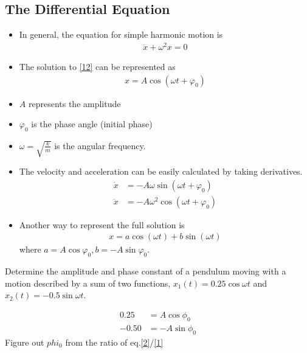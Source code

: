 \documentclass[a4paper]{article}
\numberwithin{equation}{section}
\begin{document}
\subsection{The Differential Equation}
\begin{itemize}
    \item In general, the equation for simple harmonic motion is 
    \begin{align}
        \ddot x+\omega^2 x=0
    \end{align}
    \item The solution to \eqref{12} can be represented as \begin{align}
        x=A\cos(\omega t+\varphi_0)
    \end{align} 
    \item $A$ represents the amplitude
    \item $\varphi_0$ is the phase angle (initial phase)
    \item $\omega=\sqrt{\frac{k}{m}}$ is the angular frequency.
    \item The velocity and acceleration can be easily calculated by taking derivatives.
    \begin{align}
        \dot x&=-A\omega\sin(\omega t+\varphi_0)\\
        \ddot x&=-A\omega^2\cos(\omega t+\varphi_0)
    \end{align}
    \item Another way to represent the full solution is
    \begin{align}
        x=a\cos(\omega t)+b\sin(\omega t)
    \end{align}
    where $a=A\cos\varphi_0, b=-A\sin\varphi_0$.
\end{itemize}

\begin{example}
    Determine the amplitude and phase constant of a pendulum moving with a motion described by a sum of two functions, $x_1(t)=0.25\cos\omega t$ and $x_2(t)=-0.5\sin\omega t$.
\end{example}
\begin{sol}
    \begin{align}
        0.25&=A\cos\phi_0\label{1}\\
        -0.50&=-A\sin\phi_0\label{2}
    \end{align}
    Figure out $phi_0$ from the ratio of eq.\eqref{2}/\eqref{1} %
\end{sol}
\end{document}
